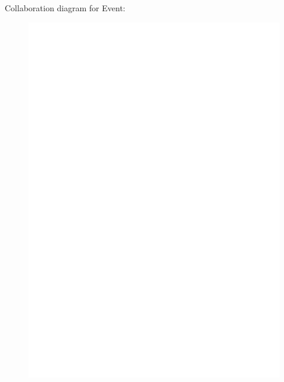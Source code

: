 Collaboration diagram for Event:\begin{figure}[H]
\begin{center}
\leavevmode
\includegraphics[width=420pt]{classEvent__coll__graph}
\end{center}
\end{figure}
